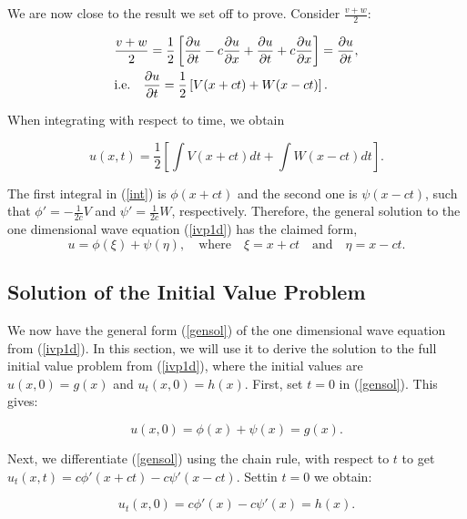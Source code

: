 \documentclass[12pt]{article}
\numberwithin{equation}{section}
\begin{document}
We are now close to the result we set off to prove. Consider $\frac{v+w}{2}$:

\begin{equation*}
    \begin{aligned}
    &\frac{v+w}{2}=\frac{1}{2}\left[\diffp[1]{u}{t}-c\diffp[1]{u}{x}+\diffp[1]{u}{t}+c\diffp[1]{u}{x}\right]=\diffp[1]{u}{t},\\
    &\textrm{i.e.} \quad \diffp[1]{u}{t}=\frac{1}{2}\left[V(x+ct)+W(x-ct)\right].
    \end{aligned}
\end{equation*}

When integrating with respect to time, we obtain

\begin{equation} \label{int}
    u(x,t)=\frac{1}{2}\left[\int{V(x+ct)dt}+\int{W(x-ct)dt}\right].
\end{equation}

The first integral in (\ref{int}) is $\phi(x+ct)$ and the second one is $\psi(x-ct)$, such that $\phi'=-\frac{1}{2c}V$ and $\psi'=\frac{1}{2c}W$, respectively.
Therefore, the general solution to the one dimensional wave equation (\ref{ivp1d}) has the claimed form, 
\begin{equation} \label{gensol}
    u=\phi(\xi)+\psi(\eta), \quad \textrm{where} \quad \xi=x+ct \quad \textrm{and} \quad \eta=x-ct.
\end{equation}

\subsection{Solution of the Initial Value Problem}
We now have the general form (\ref{gensol}) of the one dimensional wave equation from (\ref{ivp1d}). In this section, we will use it to derive the solution to
the full initial value problem from (\ref{ivp1d}), where the initial values are $u(x,0)=g(x)$ and $u_t(x,0)=h(x)$. First, set $t=0$ in (\ref{gensol}). This gives:

\begin{equation} \label{t=0}
    u(x,0)=\phi(x)+\psi(x)=g(x).
\end{equation}

Next, we differentiate (\ref{gensol}) using the chain rule, with respect to $t$ to get $u_t(x,t)=c\phi'(x+ct)-c\psi'(x-ct)$. Settin $t=0$ we obtain:

\begin{equation} \label{ut=0}
    u_t(x,0)=c\phi'(x)-c\psi'(x)=h(x).
\end{equation}
\end{document}
